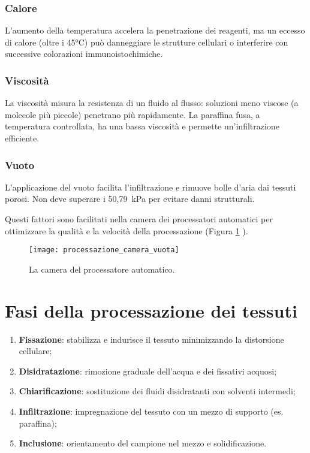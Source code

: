 \subsubsection{Calore}
L’aumento della temperatura accelera la penetrazione dei reagenti, ma un eccesso di calore (oltre i 45°C) può danneggiare le strutture cellulari o interferire con successive colorazioni immunoistochimiche.

\subsubsection{Viscosità}
La viscosità misura la resistenza di un fluido al flusso: soluzioni meno viscose (a molecole più piccole) penetrano più rapidamente. La paraffina fusa, a temperatura controllata, ha una bassa viscosità e permette un’infiltrazione efficiente.

\subsubsection{Vuoto}
L’applicazione del vuoto facilita l’infiltrazione e rimuove bolle d’aria dai tessuti porosi. Non deve superare i 50,79~kPa per evitare danni strutturali.

Questi fattori sono facilitati nella camera dei processatori automatici per ottimizzare la qualità e la velocità della processazione (Figura \ref{fig:camera_vuota} ).

\begin{figure}[htbp]
    \centering
    \texttt{[image: processazione\_camera\_vuota]}
    \caption{La camera del processatore automatico.}
    \label{fig:camera_vuota}
\end{figure}

\section{Fasi della processazione dei tessuti}
\begin{enumerate}
    \item \textbf{Fissazione}: stabilizza e indurisce il tessuto minimizzando la distorsione cellulare;
    \item \textbf{Disidratazione}: rimozione graduale dell’acqua e dei fissativi acquosi;
    \item \textbf{Chiarificazione}: sostituzione dei fluidi disidratanti con solventi intermedi;
    \item \textbf{Infiltrazione}: impregnazione del tessuto con un mezzo di supporto (es. paraffina);
    \item \textbf{Inclusione}: orientamento del campione nel mezzo e solidificazione.
\end{enumerate}


